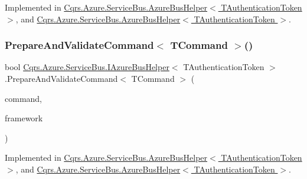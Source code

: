 Implemented in \hyperlink{classCqrs_1_1Azure_1_1ServiceBus_1_1AzureBusHelper_a0139f99e393214427b9a711bf27cae40}{Cqrs.\+Azure.\+Service\+Bus.\+Azure\+Bus\+Helper$<$ T\+Authentication\+Token $>$}, and \hyperlink{classCqrs_1_1Azure_1_1ServiceBus_1_1AzureBusHelper_a0139f99e393214427b9a711bf27cae40}{Cqrs.\+Azure.\+Service\+Bus.\+Azure\+Bus\+Helper$<$ T\+Authentication\+Token $>$}.

\mbox{\label{interfaceCqrs_1_1Azure_1_1ServiceBus_1_1IAzureBusHelper_a283ee2cf9241a5364dd5569a9f12fa10}} 
\subsubsection{\texorpdfstring{Prepare\+And\+Validate\+Command$<$ T\+Command $>$()}{PrepareAndValidateCommand< TCommand >()}}
{\footnotesize\ttfamily bool \hyperlink{interfaceCqrs_1_1Azure_1_1ServiceBus_1_1IAzureBusHelper}{Cqrs.\+Azure.\+Service\+Bus.\+I\+Azure\+Bus\+Helper}$<$ T\+Authentication\+Token $>$.Prepare\+And\+Validate\+Command$<$ T\+Command $>$ (\begin{DoxyParamCaption}\item[{T\+Command}]{command,  }\item[{string}]{framework }\end{DoxyParamCaption})}



Implemented in \hyperlink{classCqrs_1_1Azure_1_1ServiceBus_1_1AzureBusHelper_a4d03f55a58a018fbbf6fd518ad9b24f8}{Cqrs.\+Azure.\+Service\+Bus.\+Azure\+Bus\+Helper$<$ T\+Authentication\+Token $>$}, and \hyperlink{classCqrs_1_1Azure_1_1ServiceBus_1_1AzureBusHelper_a4d03f55a58a018fbbf6fd518ad9b24f8}{Cqrs.\+Azure.\+Service\+Bus.\+Azure\+Bus\+Helper$<$ T\+Authentication\+Token $>$}.

